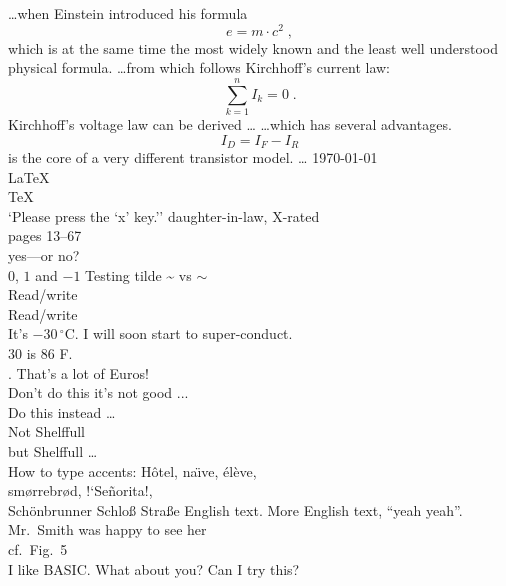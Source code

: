 \documentclass{article}
\begin{document}
\ldots when Einstein introduced his formula
\begin{equation}
e = m \cdot c^2 \; ,
\end{equation}
which is at the same time the most widely known
and the least well understood physical formula.
\ldots from which follows Kirchhoff's current law:
\begin{equation}
\sum_{k=1}^{n} I_k = 0 \; .
\end{equation}
Kirchhoff's voltage law can be derived \ldots
\ldots which has several advantages.
\begin{equation}
I_D = I_F - I_R
\end{equation}
is the core of a very different transistor model. \ldots
\today \\
\LaTeX \\
\TeX   \\
`Please press the `x' key.'' 
daughter-in-law, X-rated\\ %
pages 13--67\\ %
yes---or no? \\ %
$0$, $1$ and $-1$ %
Testing tilde \~{} vs $\sim$ \\
Read/write\\ %
Read\slash write\\ %
It's $-30\,^{\circ}\mathrm{C}$.
I will soon start to
super-conduct.\\
30 \textcelsius{} is %
86 \textdegree{}F. \\
. That's a lot of Euros!\\
Don't do this it's not good ... \\ 
Do this instead \ldots \\
Not Shelffull\\
but Shelf\mbox{}full \ldots\\
How to type accents: H\^otel, na\"\i ve, \'el\`eve,\\ %
sm\o rrebr\o d, !`Se\~norita!,\\ %
Sch\"onbrunner Schlo\ss{}
Stra\ss e
English text. 
More English text, \enquote{yeah yeah}.\\
Mr.~Smith was happy to see her\\ %
cf.~Fig.~5\\ %
I like BASIC\@. What about you? %
Can I try this?
\end{document}

